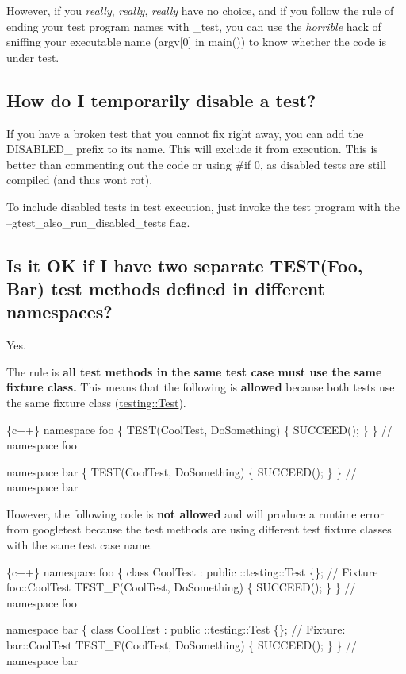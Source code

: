 However, if you {\itshape really}, {\itshape really}, {\itshape really} have no choice, and if you follow the rule of ending your test program names with {\ttfamily \+\_\+test}, you can use the {\itshape horrible} hack of sniffing your executable name ({\ttfamily argv\mbox{[}0\mbox{]}} in {\ttfamily main()}) to know whether the code is under test.

\subsection*{How do I temporarily disable a test?}

If you have a broken test that you cannot fix right away, you can add the D\+I\+S\+A\+B\+L\+E\+D\+\_\+ prefix to its name. This will exclude it from execution. This is better than commenting out the code or using \#if 0, as disabled tests are still compiled (and thus won\textquotesingle{}t rot).

To include disabled tests in test execution, just invoke the test program with the --gtest\+\_\+also\+\_\+run\+\_\+disabled\+\_\+tests flag.

\subsection*{Is it OK if I have two separate {\ttfamily T\+E\+S\+T(\+Foo, Bar)} test methods defined in different namespaces?}

Yes.

The rule is {\bfseries all test methods in the same test case must use the same fixture class.} This means that the following is {\bfseries allowed} because both tests use the same fixture class ({\ttfamily \mbox{\hyperlink{classtesting_1_1_test}{testing\+::\+Test}}}).


\begin{DoxyCode}
\{c++\}
namespace foo \{
TEST(CoolTest, DoSomething) \{
  SUCCEED();
\}
\}  // namespace foo

namespace bar \{
TEST(CoolTest, DoSomething) \{
  SUCCEED();
\}
\}  // namespace bar
\end{DoxyCode}


However, the following code is {\bfseries not allowed} and will produce a runtime error from googletest because the test methods are using different test fixture classes with the same test case name.


\begin{DoxyCode}
\{c++\}
namespace foo \{
class CoolTest : public ::testing::Test \{\};  // Fixture foo::CoolTest
TEST\_F(CoolTest, DoSomething) \{
  SUCCEED();
\}
\}  // namespace foo

namespace bar \{
class CoolTest : public ::testing::Test \{\};  // Fixture: bar::CoolTest
TEST\_F(CoolTest, DoSomething) \{
  SUCCEED();
\}
\}  // namespace bar
\end{DoxyCode}
 